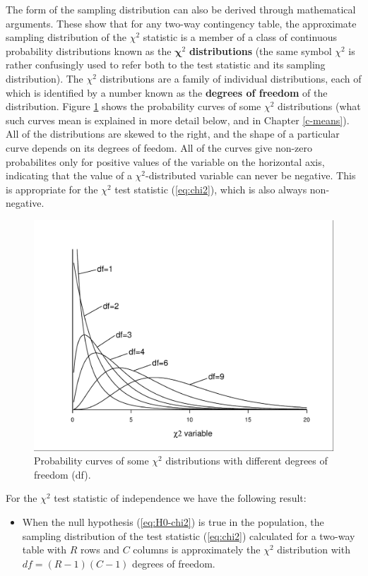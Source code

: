 \documentclass[11pt,a4paper,openany]{book}
\providecommand{\tightlist}{%
  \setlength{\itemsep}{0pt}\setlength{\parskip}{0pt}}
\begin{document}
The form of the sampling distribution can also be derived through
mathematical arguments. These show that for any two-way contingency
table, the approximate sampling distribution of the \(\chi^{2}\)
statistic is a member of a class of continuous probability distributions
known as the \(\boldsymbol{\chi}^{2}\) \textbf{distributions} (the same
symbol \(\chi^{2}\) is rather confusingly used to refer both to the test
statistic and its sampling distribution). The \(\chi^{2}\) distributions
are a family of individual distributions, each of which is identified by
a number known as the \textbf{degrees of freedom} of the distribution.
Figure \ref{fig:f-chi2dists} shows the probability curves of some
\(\chi^{2}\) distributions (what such curves mean is explained in more
detail below, and in Chapter \ref{c-means}). All of the distributions
are skewed to the right, and the shape of a particular curve depends on
its degrees of feedom. All of the curves give non-zero probabilites only
for positive values of the variable on the horizontal axis, indicating
that the value of a \(\chi^{2}\)-distributed variable can never be
negative. This is appropriate for the \(\chi^{2}\) test statistic
(\ref{eq:chi2}), which is also always non-negative.

\begin{figure}[htbp]
\centering
\includegraphics[width=11.50000cm]{chi2dists.pdf}
\caption{\label{fig:f-chi2dists} Probability curves of some \(\chi^{2}\)
distributions with different degrees of freedom (df).}
\end{figure}

For the \(\chi^{2}\) test statistic of independence we have the
following result:

\begin{itemize}
\tightlist
\item
  When the null hypothesis (\ref{eq:H0-chi2}) is true in the population,
  the sampling distribution of the test statistic (\ref{eq:chi2})
  calculated for a two-way table with \(R\) rows and \(C\) columns is
  approximately the \(\chi^{2}\) distribution with \(df=(R-1)(C-1)\)
  degrees of freedom.
\end{itemize}
\end{document}
